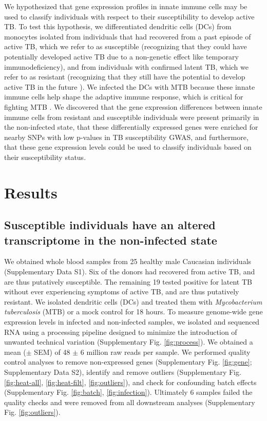 \documentclass[fleqn,10pt]{wlscirep}
\begin{document}
We hypothesized that gene expression profiles in innate immune cells
may be used to classify individuals with respect to their
susceptibility to develop active TB. To test this hypothesis, we
differentiated dendritic cells (DCs) from monocytes isolated from
individuals that had recovered from a past episode of active TB, which
we refer to as susceptible (recognizing that they could have
potentially developed active TB due to a non-genetic effect like
temporary immunodeficiency), and from individuals with confirmed
latent TB, which we refer to as resistant (recognizing that they still
have the potential to develop active TB in the future
\cite{Loddenkemper2016}). We infected the DCs with MTB because these
innate immune cells help shape the adaptive immune response, which is
critical for fighting MTB \cite{Cooper2009, Barreiro2012}. We
discovered that the gene expression differences between innate immune
cells from resistant and susceptible individuals were present
primarily in the non-infected state, that these differentially
expressed genes were enriched for nearby SNPs with low p-values in TB
susceptibility GWAS, and furthermore, that these gene expression
levels could be used to classify individuals based on their
susceptibility status.
\section*{Results}

\subsection*{Susceptible individuals have an altered transcriptome in the non-infected state}

We obtained whole blood samples from 25 healthy male Caucasian
individuals (Supplementary Data S1). Six of the donors had recovered
from active TB, and are thus putatively susceptible. The remaining 19
tested positive for latent TB without ever experiencing symptoms of
active TB, and are thus putatively resistant. We isolated dendritic
cells (DCs) and treated them with \emph{Mycobacterium
}\emph{tuberculosis} (MTB) or a mock control for 18 hours. To measure
genome-wide gene expression levels in infected and non-infected
samples, we isolated and sequenced RNA using a processing pipeline
designed to minimize the introduction of unwanted technical variation
(Supplementary Fig. \ref{fig:process}). We obtained a mean ($\pm$ SEM)
of 48 $\pm$ 6 million raw reads per sample. We performed quality
control analyses to remove non-expressed genes (Supplementary Fig.
\ref{fig:gene}; Supplementary Data S2), identify and remove outliers
(Supplementary Fig. \ref{fig:heat-all}, \ref{fig:heat-filt},
\ref{fig:outliers}), and check for confounding batch effects
(Supplementary Fig. \ref{fig:batch}, \ref{fig:infection}). Ultimately
6 samples failed the quality checks and were removed from all
downstream analyses (Supplementary Fig. \ref{fig:outliers}).
\end{document}
